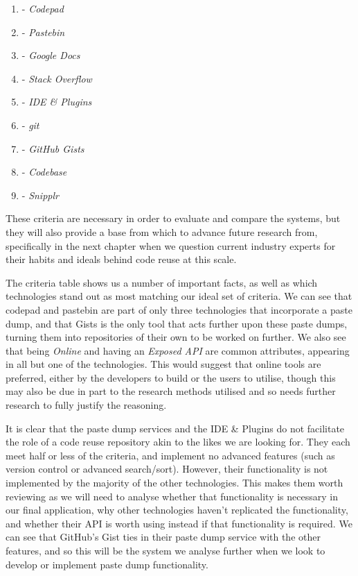 \begin{enumerate}[label=\Alph*]
\item - \textit{Codepad}
\item - \textit{Pastebin}
\item - \textit{Google Docs}
\item - \textit{Stack Overflow}
\item - \textit{IDE \& Plugins}
\item - \textit{git}
\item - \textit{GitHub Gists}
\item - \textit{Codebase}
\item - \textit{Snipplr}
\end{enumerate}


These criteria are necessary in order to evaluate and compare the systems, but they will also provide a base from which to advance future research from, specifically in the next chapter when we question current industry experts for their habits and ideals behind code reuse at this scale.

The criteria table shows us a number of important facts, as well as which technologies stand out as most matching our ideal set of criteria.
We can see that codepad and pastebin are part of only three technologies that incorporate a paste dump, and that Gists is the only tool that acts further upon these paste dumps, turning them into repositories of their own to be worked on further.
We also see that being \textit{Online} and having an \textit{Exposed API} are common attributes, appearing in all but one of the technologies.
This would suggest that online tools are preferred, either by the developers to build or the users to utilise, though this may also be due in part to the research methods utilised and so needs further research to fully justify the reasoning.

It is clear that the paste dump services and the IDE \& Plugins do not facilitate the role of a code reuse repository akin to the likes we are looking for.
They each meet half or less of the criteria, and implement no advanced features (such as version control or advanced search/sort).
However, their functionality is not implemented by the majority of the other technologies.
This makes them worth reviewing as we will need to analyse whether that functionality is necessary in our final application, why other technologies haven't replicated the functionality, and whether their API is worth using instead if that functionality is required.
We can see that GitHub's Gist ties in their paste dump service with the other features, and so this will be the system we analyse further when we look to develop or implement paste dump functionality.


